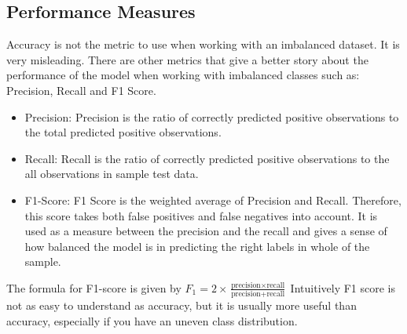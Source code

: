  \subsection{Performance Measures}
 Accuracy is not the metric to use when working with an imbalanced dataset. It is very misleading. There are other metrics that give a better story about the performance of the model when working with imbalanced classes such as: Precision, Recall and F1 Score.
 \begin{itemize}
     \item Precision: Precision is the ratio of correctly predicted positive observations to the total predicted positive observations. 
     \item Recall: Recall is the ratio of correctly predicted positive observations to the all observations in sample test data.
     \item F1-Score: F1 Score is the weighted average of Precision and Recall. Therefore, this score takes both false positives and false negatives into account. It is used as a measure between the precision and the recall and gives a sense of how balanced the model is in predicting the right labels in whole of the sample.
 \end{itemize}
 The formula for F1-score is given by $F_{1}=2 \times \frac{\text{precision} \times \text{recall}}{\text{precision} + \text{recall}}$
 \newline
 Intuitively F1 score is not as easy to understand as accuracy, but it is usually more useful than accuracy, especially if you have an uneven class distribution.
